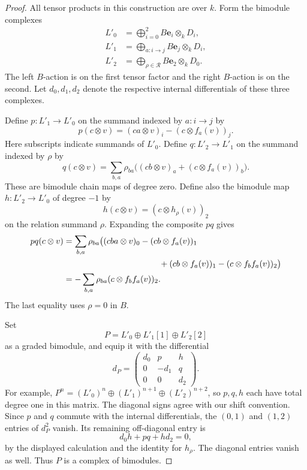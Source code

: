 \documentclass[11pt]{article}
\numberwithin{equation}{section}
\theoremstyle{definition}
\theoremstyle{remark}
\begin{document}
\begin{proof}
All tensor products in this construction are over \(k\). Form the
bimodule complexes
\begin{align*}
 L'_0&=\bigoplus_{i=0}^2 B\mathbf e_i\otimes_k D_i,\\
 L'_1&=\bigoplus_{a:i\to j}B\mathbf e_j\otimes_k D_i,\\
 L'_2&=\bigoplus_{\rho\in\mathcal R}B\mathbf e_2\otimes_k D_0.
\end{align*}
The left \(B\)-action is on the first tensor factor and the right
\(B\)-action is on the second.  Let
\(d_0,d_1,d_2\) denote the respective internal differentials of these
three complexes.

Define $p:L'_1\to L'_0$ on the summand indexed by \(a:i\to j\) by
\[
 p(c\otimes v)
  =(ca\otimes v)_i-(c\otimes f_a(v))_j .
\]
Here subscripts indicate summands of \(L'_0\). Define
$q:L'_2\to L'_1$ on the summand indexed by \(\rho\) by
\[
 q(c\otimes v)
  =\sum_{b,a}\rho_{ba}
       \bigl((cb\otimes v)_a+(c\otimes f_a(v))_b\bigr).
\]
These are bimodule chain maps of degree zero.  Define also the
bimodule map \(h:L'_2\to L'_0\) of degree \(-1\) by
\[
 h(c\otimes v)=(c\otimes h_\rho(v))_2
\]
on the relation summand \(\rho\).  Expanding the composite \(pq\)
gives
\begin{align*}
 pq(c\otimes v)
 &=\sum_{b,a}\rho_{ba}
   \bigl(
     (cba\otimes v)_0-(cb\otimes f_a(v))_1\\
 &\hspace{40mm}
     +(cb\otimes f_a(v))_1-(c\otimes f_bf_a(v))_2
   \bigr)\\
 &=-\sum_{b,a}\rho_{ba}(c\otimes f_bf_a(v))_2.
\end{align*}
The last equality uses \(\rho=0\) in \(B\).

Set
\[
 P=L'_0\oplus L'_1[1]\oplus L'_2[2]
\]
as a graded bimodule, and equip it with the differential
\[
 d_P=
 \begin{pmatrix}
   d_0 & p    & h\\
   0   & -d_1 & q\\
   0   & 0    & d_2
 \end{pmatrix}.
\]
For example, \(P^n=(L'_0)^n\oplus(L'_1)^{n+1}
\oplus(L'_2)^{n+2}\), so \(p,q,h\) each have total degree one
in this matrix.  The diagonal signs agree with our shift convention.
Since \(p\) and \(q\) commute with the internal differentials,
the \((0,1)\) and \((1,2)\) entries of \(d_P^2\) vanish.
Its remaining off-diagonal entry is
\[
 d_0h+pq+hd_2=0,
\]
by the displayed calculation and the identity for \(h_\rho\).
The diagonal entries vanish as well.  Thus \(P\) is a complex of
bimodules.


\end{proof}
\end{document}
